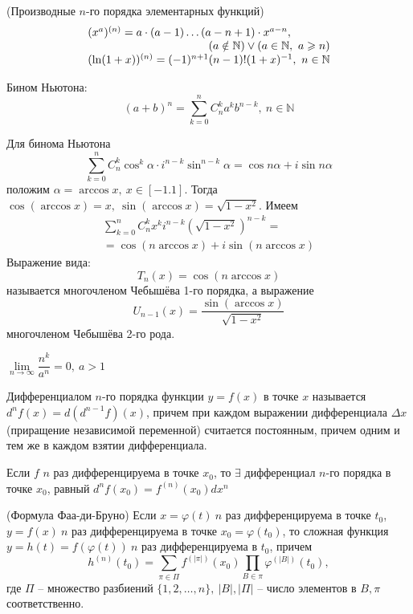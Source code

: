 \begin{multicols}{2}
\begin{theorema}{(Производные $n$-го порядка элементарных функций)}{}
\[\begin{array}{l}
                (x^a)^{(n)} = a\cdot (a-1)\ldots (a-n+1)\cdot x^{a-n},\ \\
                \hfill (a\notin \mathbb N) \vee (a\in\mathbb N, \ a \geq n)\\
                (\ln(1+x))^{(n)} = (-1)^{n+1}(n-1)!(1+x)^{-1},\ n\in\mathbb N
        \end{array}
    \]
\end{theorema}
    \cons Бином Ньютона: \[(a+b)^n = \sum\limits_{k=0}^n C_n^ka^kb^{n-k},\ n\in\mathbb N\]
    \begin{proposition}{}{} Для бинома Ньютона\[
            \sum\limits_{k=0}^n C_n^k \cos^k\alpha \cdot i^{n-k}\sin^{n-k}\alpha = \cos n\alpha + i\sin n\alpha
    \]положим $\alpha = \arccos x,\ x\in [-1.1]$. Тогда $\cos(\arccos x) = x,\ \sin(\arccos x) = \sqrt{1-x^2}.$ Имеем
    \[
        \begin{array}{c}
            \sum\limits_{k=0}^n C_n^kx^ki^{n-k}(\sqrt{1-x^2})^{n-k} = \\ = \cos(n\arccos x) + i\sin(n\arccos x)            
        \end{array}
    \]
    Выражение вида:\[
        T_n(x) = \cos(n\arccos x)
    \] называется многочленом Чебышёва 1-го порядка, а выражение\[
    U_{n-1}(x) = \dfrac{\sin(\arccos x)}{\sqrt{1-x^2}}
    \] многочленом Чебышёва 2-го рода.
\end{proposition}
    \cons $\lim\limits_{n \to \infty} \dfrac{n^k}{a^n} = 0,\ a > 1$
    \begin{definition}{}{} 
        Дифференциалом $n$-го порядка функции $y = f(x)$ в точке $x$ называется $d^nf(x) = d(d^{n-1}f)(x)$, причем при каждом выражении дифференциала $\Delta x$ (приращение независимой переменной) считается постоянным, причем одним и тем же в каждом взятии дифференциала.
    \end{definition}
    \begin{note}{}{}
        Если $f$ $n$ раз дифференцируема в точке $x_0$, то $\exists$ дифференциал $n$-го порядка в точке $x_0$, равный $d^nf(x_0) = f^{(n)}(x_0)dx^n$
    \end{note}
    \begin{theorema}{(Формула Фаа-ди-Бруно)}{}
     Если $x = \varphi(t)\ n$ раз дифференцируема в точке $t_0$, $y = f(x)\ n$ раз дифференцируема в точке $x_0 = \varphi(t_0)$, то сложная функция $y = h(t) = f(\varphi(t))\ n$ раз дифференцируема в $t_0$, причем \[
            h^{(n)} (t_0) = \sum\limits_{\pi \in\Pi} f^{(|\pi|)}(x_0)\prod\limits_{B \in \pi}\varphi^{(|B|)}(t_0),
    \] где $\Pi$ -- множество разбиений $\{1,2,\ldots, n\},\ |B|, |\Pi|$ -- число элементов в $B, \pi$ соответственно.
    \end{theorema}


\end{multicols}
